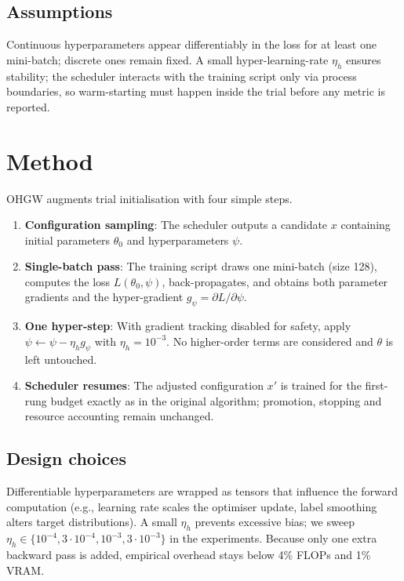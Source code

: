 \documentclass{article}
\begin{document}
\subsection{Assumptions}
Continuous hyperparameters appear differentiably in the loss for at least one mini-batch; discrete ones remain fixed. A small hyper-learning-rate \(\eta_h\) ensures stability; the scheduler interacts with the training script only via process boundaries, so warm-starting must happen inside the trial before any metric is reported.

\section{Method}
OHGW augments trial initialisation with four simple steps.

\begin{enumerate}
  \item \textbf{Configuration sampling}: The scheduler outputs a candidate \(x\) containing initial parameters \(\theta_0\) and hyperparameters \(\psi\).
  \item \textbf{Single-batch pass}: The training script draws one mini-batch (size 128), computes the loss \(L(\theta_0,\psi)\), back-propagates, and obtains both parameter gradients and the hyper-gradient \(g_{\psi} = \partial L/\partial \psi\).
  \item \textbf{One hyper-step}: With gradient tracking disabled for safety, apply \(\psi \leftarrow \psi - \eta_h g_{\psi}\) with \(\eta_h = 10^{-3}\). No higher-order terms are considered and \(\theta\) is left untouched.
  \item \textbf{Scheduler resumes}: The adjusted configuration \(x'\) is trained for the first-rung budget exactly as in the original algorithm; promotion, stopping and resource accounting remain unchanged.
\end{enumerate}

\subsection{Design choices}
Differentiable hyperparameters are wrapped as tensors that influence the forward computation (e.g., learning rate scales the optimiser update, label smoothing alters target distributions). A small \(\eta_h\) prevents excessive bias; we sweep \(\eta_h\in\{10^{-4}, 3\cdot10^{-4}, 10^{-3}, 3\cdot10^{-3}\}\) in the experiments. Because only one extra backward pass is added, empirical overhead stays below 4\% FLOPs and 1\% VRAM.
\end{document}
